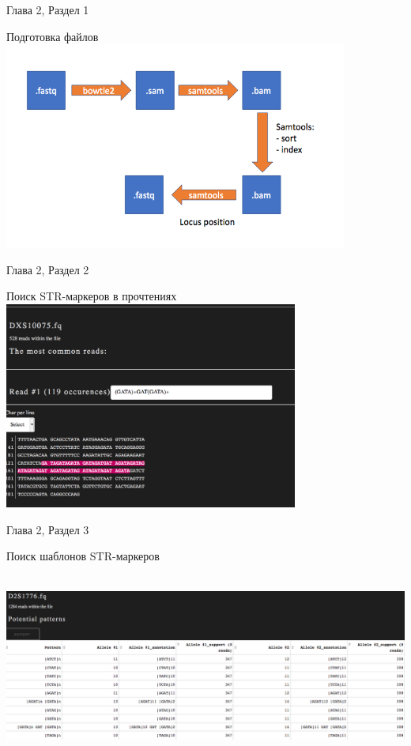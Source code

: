 \documentclass[8pt]{beamer}
\begin{document}
\begin{frame}{Глава 2, Раздел 1}
    \begin{block}{Подготовка файлов}
        \includegraphics[height=6.8cm]{images/locus_r.png}
        \centering
    \end{block}
\end{frame}

\begin{frame}{Глава 2, Раздел 2}
    \begin{block}{Поиск STR-маркеров в прочтениях}
        \includegraphics[height=6.8cm]{images/str_search.png}
        \centering
    \end{block}
\end{frame}

\begin{frame}{Глава 2, Раздел 3}
    \begin{block}{Поиск шаблонов STR-маркеров}
        \includegraphics[height=6.8cm]{images/str_pat_search.png}
        \centering
    \end{block}
\end{frame}
\end{document}
